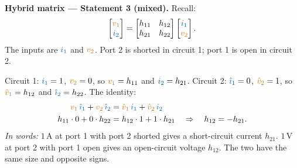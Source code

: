 \documentclass[11pt,a4paper]{article}
\newcommand{\Icol}[1]{\textcolor{ccur}{#1}}
\newcommand{\Vcol}[1]{\textcolor{cvolt}{#1}}
\newcommand{\uni}[1]{\,\mathrm{#1}}
\newcommand{\A}{\uni{A}}   \newcommand{\V}{\uni{V}}
\newcommand{\vone}{\Vcol{v_1}}  \newcommand{\vtwo}{\Vcol{v_2}}
\newcommand{\ione}{\Icol{i_1}}  \newcommand{\itwo}{\Icol{i_2}}
\newcommand{\rcp}[4]{%
  \draw[elem] (1.6,-0.2) rectangle (3.8,2.2);
  \node[align=center, font=\small] at (2.7,1.0) {LTI\\ resistors};
  \draw (1.1,1.8) -- (1.6,1.8); \draw (1.1,0) -- (1.6,0);
  \draw (3.8,1.8) -- (4.3,1.8); \draw (3.8,0) -- (4.3,0);
  \ifcase#1
    \draw (0,1.8) to[american voltage source, l_=#2] (0,0); \draw (0,1.8) -- (1.1,1.8); \draw (0,0) -- (1.1,0);
  \or
    \draw (0,0) to[american current source, l=#2] (0,1.8); \draw (0,1.8) -- (1.1,1.8); \draw (0,0) -- (1.1,0);
  \or
    \draw (0,1.8) -- (0,0); \draw (0,1.8) -- (1.1,1.8); \draw (0,0) -- (1.1,0);
    \draw[iar] (0.25,2.08) -- (0.85,2.08); \node[font=\small, anchor=south] at (0.55,2.12) {#2};
  \or
    \node[pol] at (1.05,1.45) {$+$}; \node[pol] at (1.05,0.35) {$-$};
    \node[font=\small, anchor=east] at (1.0,0.9) {#2};
  \or
    \draw (0,1.8) -- (0,1.22); \draw (0,0.58) -- (0,0);
    \node[circle, draw, thick, minimum size=0.64cm, inner sep=0pt, font=\small\bfseries] at (0,0.9) {A};
    \node[font=\small, anchor=east] at (-0.38,0.9) {#2};
    \draw (0,1.8) -- (1.1,1.8); \draw (0,0) -- (1.1,0);
  \fi
  \ifcase#3
    \draw (5.4,1.8) to[american voltage source, l=#4] (5.4,0); \draw (4.3,1.8) -- (5.4,1.8); \draw (4.3,0) -- (5.4,0);
  \or
    \draw (5.4,0) to[american current source, l_=#4] (5.4,1.8); \draw (4.3,1.8) -- (5.4,1.8); \draw (4.3,0) -- (5.4,0);
  \or
    \draw (5.4,1.8) -- (5.4,0); \draw (4.3,1.8) -- (5.4,1.8); \draw (4.3,0) -- (5.4,0);
    \draw[iar] (5.15,2.08) -- (4.55,2.08); \node[font=\small, anchor=south] at (4.85,2.12) {#4};
  \or
    \node[pol] at (4.35,1.45) {$+$}; \node[pol] at (4.35,0.35) {$-$};
    \node[font=\small, anchor=west] at (4.4,0.9) {#4};
  \or
    \draw (5.4,1.8) -- (5.4,1.22); \draw (5.4,0.58) -- (5.4,0);
    \node[circle, draw, thick, minimum size=0.64cm, inner sep=0pt, font=\small\bfseries] at (5.4,0.9) {A};
    \node[font=\small, anchor=west] at (5.78,0.9) {#4};
    \draw (4.3,1.8) -- (5.4,1.8); \draw (4.3,0) -- (5.4,0);
  \fi
  \draw (1.1,1.8) node[ocirc] {}; \draw (1.1,0) node[ocirc] {};
  \draw (4.3,1.8) node[ocirc] {}; \draw (4.3,0) node[ocirc] {};}
\newcommand{\lcur}[1]{\draw[iar] (0.25,2.08) -- (0.85,2.08); \node[font=\small, anchor=south] at (0.55,2.12) {#1};}
\newcommand{\rcur}[1]{\draw[iar] (5.15,2.08) -- (4.55,2.08); \node[font=\small, anchor=south] at (4.85,2.12) {#1};}
\newcommand{\mtest}[2]{%
  \ifnum#2=1
    \if#1R \rcp{1}{$\Icol{1\A}$}{3}{$\Vcol{r_{21}}$}\fi
    \if#1G \rcp{0}{$\Vcol{1\V}$}{2}{$\Icol{g_{21}}$}\lcur{$\Icol{g_{11}}$}\fi
    \if#1H \rcp{1}{$\Icol{1\A}$}{2}{$\Icol{h_{21}}$}\fi
    \if#1T \rcp{0}{$\Vcol{A}$}{3}{$\Vcol{1\V}$}\lcur{$\Icol{C}$}\fi
  \else
    \if#1R \rcp{3}{$\Vcol{r_{12}}$}{1}{$\Icol{1\A}$}\fi
    \if#1G \rcp{2}{$\Icol{g_{12}}$}{0}{$\Vcol{1\V}$}\rcur{$\Icol{g_{22}}$}\fi
    \if#1H \rcp{3}{$\Vcol{h_{12}}$}{0}{$\Vcol{1\V}$}\rcur{$\Icol{h_{22}}$}\fi
    \if#1T \rcp{0}{$\Vcol{B}$}{2}{$\Icol{-1\A}$}\lcur{$\Icol{D}$}\fi
  \fi}
\newcommand{\mpair}[1]{%
  \mtest{#1}{1}
  \begin{scope}[xshift=7.8cm] \mtest{#1}{2} \end{scope}
  \node[font=\small, text=metugray] at (2.7,-0.75) {circuit 1};
  \node[font=\small, text=metugray] at (10.5,-0.75) {circuit 2};}
\begin{document}
\noindent\textbf{Hybrid matrix --- Statement 3 (mixed).} Recall:
\[
  \begin{bmatrix} \vone\\ \itwo \end{bmatrix} = \begin{bmatrix} h_{11} & h_{12}\\ h_{21} & h_{22} \end{bmatrix} \begin{bmatrix} \ione\\ \vtwo \end{bmatrix} .
\]
The inputs are $\ione$ and $\vtwo$. Port 2 is shorted in circuit 1; port 1 is open in circuit 2.
\begin{center}
\end{center}
Circuit 1: $\ione = 1$, $\vtwo = 0$, so $\vone = h_{11}$ and $\itwo = h_{21}$. Circuit 2: $\Icol{\hat\imath_1} = 0$, $\Vcol{\hat v_2} = 1$, so $\Vcol{\hat v_1} = h_{12}$ and $\Icol{\hat\imath_2} = h_{22}$. The identity:
\begin{align*}
  \vone\,\Icol{\hat\imath_1} + \vtwo\,\Icol{\hat\imath_2} &= \Vcol{\hat v_1}\,\ione + \Vcol{\hat v_2}\,\itwo\\
  h_{11} \cdot 0 + 0 \cdot h_{22} &= h_{12} \cdot 1 + 1 \cdot h_{21} \quad\Rightarrow\quad h_{12} = -h_{21} .
\end{align*}
\emph{In words:} $1\A$ at port 1 with port 2 shorted gives a short-circuit current $h_{21}$. $1\V$ at port 2 with port 1 open gives an open-circuit voltage $h_{12}$. The two have the same size and opposite signs.
\end{document}
